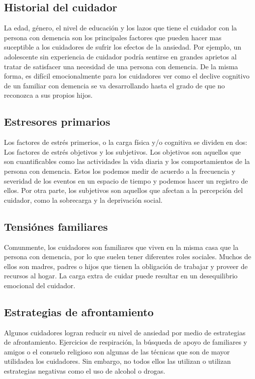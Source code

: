 	\subsection{Historial del cuidador}{\label{secc:modeloAnsiedadCaregivers}}
		La edad, g\'enero, el nivel de educaci\'on y los lazos que tiene el cuidador con la persona con demencia son los principales factores que pueden hacer mas suceptible a los cuidadores de sufrir los efectos de la ansiedad. Por ejemplo, un adolescente sin experiencia de cuidador podr\'ia sentirse en grandes aprietos al tratar de satisfacer una necesidad de una persona con demencia. De la misma forma, es dif\'icil emocionalmente para los cuidadores ver como el declive cognitivo de un familiar con demencia se va desarrollando hasta el grado de que no reconozca a sus propios hijos.
	\subsection{Estresores primarios}{\label{secc:modeloAnsiedadStressFactors}}
		Los factores de estr\'es primerios, o la carga f\'isica y/o cognitiva se dividen en dos: Los factores de estr\'es objetivos y los subjetivos. Los objetivos son aquellos que son cuantificables como las actividades la vida diaria y los comportamientos de la persona con demencia. Estos los podemos medir de acuerdo a la frecuencia y severidad de los eventos en un espacio de tiempo y podemos hacer un registro de ellos. Por otra parte, los subjetivos son aquellos que afectan a la percepci\'on del cuidador, como la sobrecarga y la deprivaci\'on social.
	\subsection{Tensi\'ones familiares}{\label{secc:modeloAnsiedadSecondaryroles}}
		Comunmente, los cuidadores son familiares que viven en la misma casa que la persona con demencia, por lo que suelen tener diferentes roles sociales. Muchos de ellos son madres, padres o hijos que tienen la obligaci\'on de trabajar y proveer de recursos al hogar. La carga extra de cuidar puede resultar en un desequilibrio emocional del cuidador.
	
	\subsection{Estrategias de afrontamiento}{\label{secc:modeloAnsiedadCoping}}
	Algunos cuidadores logran reducir su nivel de ansiedad por medio de estrategias de afrontamiento. Ejercicios de respiraci\'on, la b\'usqueda de apoyo de familiares y amigos o el consuelo religioso \citep{Sharma20121287} son algunas de las t\'ecnicas que son de mayor utilidadea los cuidadores. Sin embargo, no todos ellos las utilizan o utilizan estrategias negativas como el uso de alcohol o drogas.

